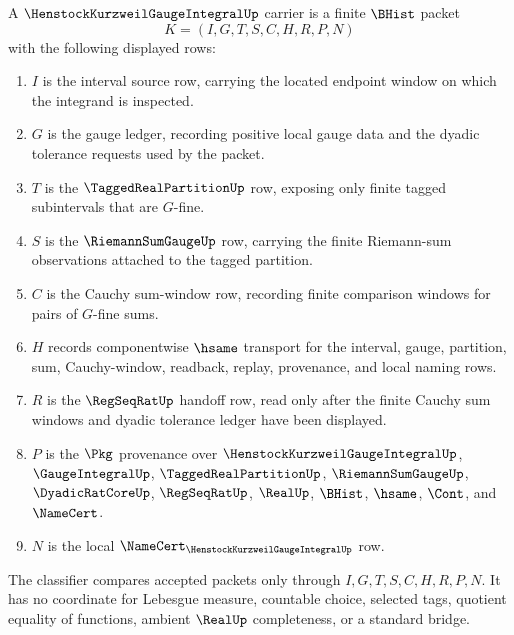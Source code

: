 \begin{definition}
\label{def:henstock-kurzweil-gauge-integral-carrier}
A $\HenstockKurzweilGaugeIntegralUp$ carrier is a finite $\BHist$ packet
$$
K=(I,G,T,S,C,H,R,P,N)
$$
with the following displayed rows:
\begin{enumerate}
\item $I$ is the interval source row, carrying the located endpoint window on which the integrand is inspected.
\item $G$ is the gauge ledger, recording positive local gauge data and the dyadic tolerance requests used by the packet.
\item $T$ is the $\TaggedRealPartitionUp$ row, exposing only finite tagged subintervals that are $G$-fine.
\item $S$ is the $\RiemannSumGaugeUp$ row, carrying the finite Riemann-sum observations attached to the tagged partition.
\item $C$ is the Cauchy sum-window row, recording finite comparison windows for pairs of $G$-fine sums.
\item $H$ records componentwise $\hsame$ transport for the interval, gauge, partition, sum, Cauchy-window, readback, replay, provenance, and local naming rows.
\item $R$ is the $\RegSeqRatUp$ handoff row, read only after the finite Cauchy sum windows and dyadic tolerance ledger have been displayed.
\item $P$ is the $\Pkg$ provenance over $\HenstockKurzweilGaugeIntegralUp$, $\GaugeIntegralUp$, $\TaggedRealPartitionUp$, $\RiemannSumGaugeUp$, $\DyadicRatCoreUp$, $\RegSeqRatUp$, $\RealUp$, $\BHist$, $\hsame$, $\Cont$, and $\NameCert$.
\item $N$ is the local $\NameCert_{\HenstockKurzweilGaugeIntegralUp}$ row.
\end{enumerate}
The classifier compares accepted packets only through $I,G,T,S,C,H,R,P,N$. It has no coordinate for Lebesgue measure, countable choice, selected tags, quotient equality of functions, ambient $\RealUp$ completeness, or a standard bridge.
\end{definition}

